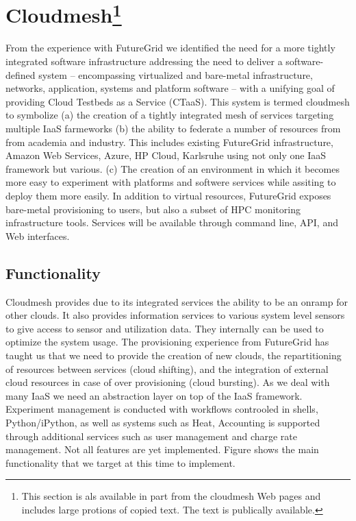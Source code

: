 
\section{Cloudmesh\footnote{This section is als available in part from
  the cloudmesh Web pages and includes large protions of copied
  text. The text is publically available.}}\label{S:cloudmesh}

From the experience with FutureGrid we identified the need for a more
tightly integrated software infrastructure addressing the need to
deliver a software-defined system – encompassing virtualized and
bare-metal infrastructure, networks, application, systems and platform
software – with a unifying goal of providing Cloud Testbeds as a
Service (CTaaS). This system is termed cloudmesh to symbolize (a) the
creation of a tightly integrated mesh of services targeting multiple
IaaS farmeworks (b) the ability to federate a number of resources from
from academia and industry. This includes existing FutureGrid
infrastructure, Amazon Web Services, Azure, HP Cloud, Karlsruhe using
not only one IaaS framework but various. (c) The creation of an
environment in which it becomes more easy to experiment with platforms
and softwere services while assiting to deploy them more easily.
In addition to virtual resources, FutureGrid exposes bare-metal
provisioning to users, but also a subset of HPC monitoring
infrastructure tools. Services will be available through command line,
API, and Web interfaces.

\subsection{Functionality}

Cloudmesh provides due to its integrated services the ability to be an
onramp for other clouds. It also provides information services to
various system level sensors to give access to sensor and utilization
data. They internally can be used to optimize the system
usage. The provisioning experience from FutureGrid has taught us that
we need to provide the creation of new clouds, the repartitioning of
resources between services (cloud shifting), and the integration of
external cloud resources in case of over provisioning (cloud
bursting). As we deal with many IaaS we need an abstraction layer on
top of the IaaS framework. Experiment management is conducted with
workflows controoled in shells, Python/iPython, as well as systems
such as Heat, Accounting is supported through additional services such
as user management and charge rate management. Not all features are
yet implemented. Figure \label{F:cm-func} shows the main functionality
that we target at this time to implement.

